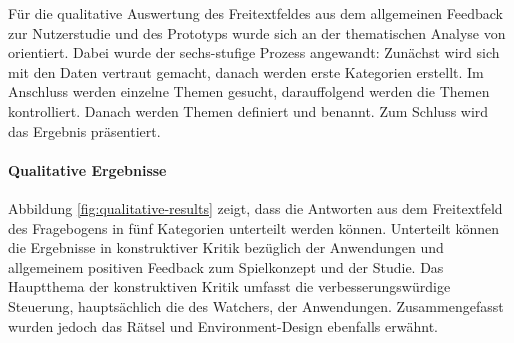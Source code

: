 Für die qualitative Auswertung des Freitextfeldes  aus dem allgemeinen Feedback zur Nutzerstudie und des Prototyps wurde sich an der thematischen Analyse von \cite{braun_using_2006} orientiert. Dabei wurde der sechs-stufige Prozess angewandt: Zunächst wird sich mit den Daten vertraut gemacht, danach werden erste Kategorien erstellt. Im Anschluss werden einzelne Themen gesucht, darauffolgend werden die Themen kontrolliert. Danach werden Themen definiert und benannt. Zum Schluss wird das Ergebnis präsentiert.

\paragraph{Qualitative Ergebnisse}
Abbildung \ref{fig:qualitative-results} zeigt, dass die Antworten aus dem Freitextfeld des Fragebogens in fünf Kategorien unterteilt werden können.
Unterteilt können die Ergebnisse in konstruktiver Kritik bezüglich der Anwendungen und allgemeinem positiven Feedback zum Spielkonzept und der Studie.
Das Hauptthema der konstruktiven Kritik umfasst die verbesserungswürdige Steuerung, hauptsächlich die des Watchers, der Anwendungen. Zusammengefasst wurden jedoch das Rätsel und Environment-Design ebenfalls erwähnt.



